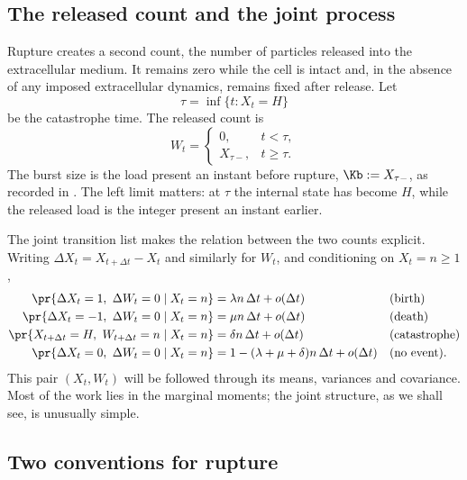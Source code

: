 \FloatBarrier

\subsection{The released count and the joint process}
\label{bdc:sec:released}

Rupture creates a second count, the number of particles released into the
extracellular medium. It remains zero while the cell is intact and, in the
absence of any imposed extracellular dynamics, remains fixed after release. Let
\[
\tau=\inf\{t:X_t=H\}
\]
be the catastrophe time. The released count is
\begin{equation}
\label{bdc:eq:release}
W_t=
\begin{cases}
0,&t<\tau,\\
X_{\tau-},&t\ge\tau.
\end{cases}
\end{equation}
The burst size is the load present an instant before rupture,
$\Kb:=X_{\tau-}$, as recorded in
. The left limit matters: at
$\tau$ the internal state has become $H$, while the released load is the
integer present an instant earlier.

The joint transition list makes the relation between the two counts explicit.
Writing $\Delta X_t=X_{t+\Delta t}-X_t$ and similarly for $W_t$, and conditioning
on $X_t=n\ge1$,
\begin{align}
\label{bdc:eq:joint}
\pr{\Delta X_t = 1,\ \Delta W_t = 0 \mid X_t=n} &=
\lambda n\,\Delta t+o(\Delta t)
&&\text{(birth)}\notag\\
\pr{\Delta X_t = -1,\ \Delta W_t = 0 \mid X_t=n} &=
\mu n\,\Delta t+o(\Delta t)
&&\text{(death)}\notag\\
\pr{X_{t+\Delta t} = H,\ W_{t+\Delta t} = n \mid X_t=n} &=
\delta n\,\Delta t+o(\Delta t)
&&\text{(catastrophe)}\\
\pr{\Delta X_t = 0,\ \Delta W_t = 0 \mid X_t=n} &=
1-(\lambda+\mu+\delta)n\,\Delta t+o(\Delta t)
&&\text{(no event)}\notag .
\end{align}
This pair $(X_t,W_t)$ will be followed through its means, variances and
covariance. Most of the work lies in the marginal moments; the joint structure,
as we shall see, is unusually simple.

\subsection{Two conventions for rupture}
\label{bdc:sec:conventions}

